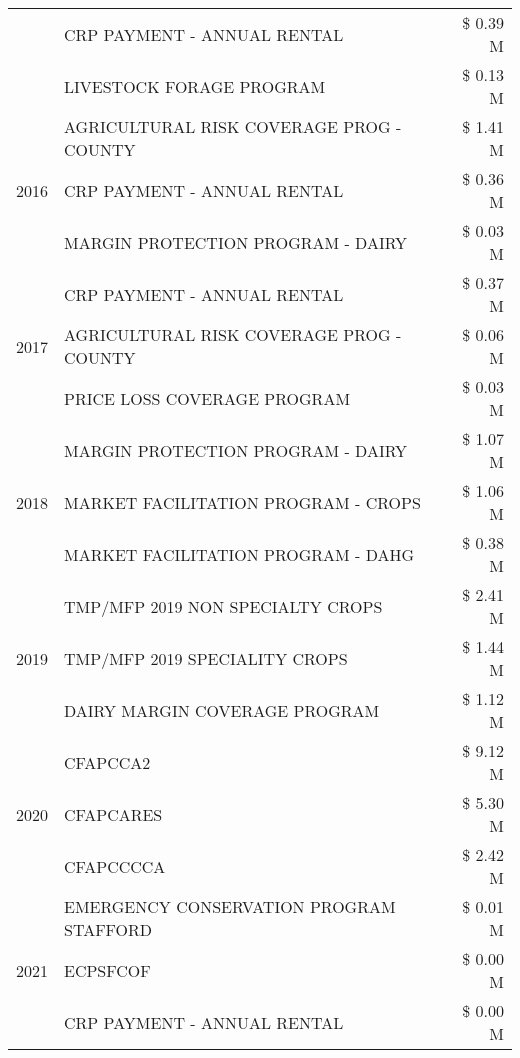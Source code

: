 \begin{tabular}{llr}
 & CRP PAYMENT - ANNUAL RENTAL & \$ 0.39 M \\
 & LIVESTOCK FORAGE PROGRAM & \$ 0.13 M \\
\cline{1-3}
\multirow[t]{3}{*}{2016} & AGRICULTURAL RISK COVERAGE PROG - COUNTY & \$ 1.41 M \\
 & CRP PAYMENT - ANNUAL RENTAL & \$ 0.36 M \\
 & MARGIN PROTECTION PROGRAM - DAIRY & \$ 0.03 M \\
\cline{1-3}
\multirow[t]{3}{*}{2017} & CRP PAYMENT - ANNUAL RENTAL & \$ 0.37 M \\
 & AGRICULTURAL RISK COVERAGE PROG - COUNTY & \$ 0.06 M \\
 & PRICE LOSS COVERAGE PROGRAM & \$ 0.03 M \\
\cline{1-3}
\multirow[t]{3}{*}{2018} & MARGIN PROTECTION PROGRAM - DAIRY & \$ 1.07 M \\
 & MARKET FACILITATION PROGRAM - CROPS & \$ 1.06 M \\
 & MARKET FACILITATION PROGRAM - DAHG & \$ 0.38 M \\
\cline{1-3}
\multirow[t]{3}{*}{2019} & TMP/MFP 2019 NON SPECIALTY CROPS & \$ 2.41 M \\
 & TMP/MFP 2019 SPECIALITY CROPS & \$ 1.44 M \\
 & DAIRY MARGIN COVERAGE PROGRAM & \$ 1.12 M \\
\cline{1-3}
\multirow[t]{3}{*}{2020} & CFAPCCA2 & \$ 9.12 M \\
 & CFAPCARES & \$ 5.30 M \\
 & CFAPCCCCA & \$ 2.42 M \\
\cline{1-3}
\multirow[t]{3}{*}{2021} & EMERGENCY CONSERVATION PROGRAM STAFFORD & \$ 0.01 M \\
 & ECPSFCOF & \$ 0.00 M \\
 & CRP PAYMENT - ANNUAL RENTAL & \$ 0.00 M \\
\cline{1-3}
\bottomrule
\end{tabular}
